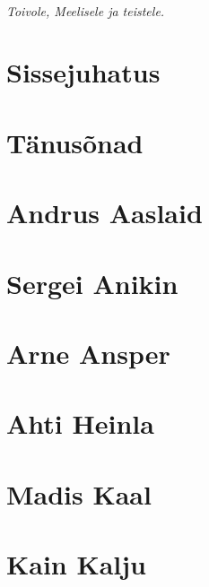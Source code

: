 \documentclass{tufte-book}
\let\oldchapter\chapter
\def\chapter{%
  \setcounter{footnote}{0}%
  \oldchapter
}
\begin{document}
\tableofcontents



\cleardoublepage
~\vfill
\begin{doublespace}
\noindent\fontsize{18}{22}\selectfont\itshape
\nohyphenation
Toivole, Meelisele ja teistele.
\end{doublespace}
\vfill
\vfill


\cleardoublepage
\chapter{Sissejuhatus}


\chapter{Tänusõnad}

 
\mainmatter


\chapter{Andrus Aaslaid}


\chapter{Sergei Anikin}


\chapter{Arne Ansper}


\chapter{Ahti Heinla}


\chapter{Madis Kaal}


\chapter{Kain Kalju}

\end{document}
